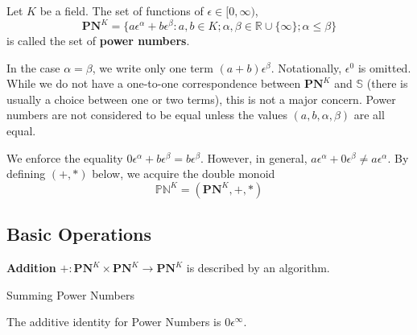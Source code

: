 \documentclass[acmsmall]{acmart}
\begin{document}
\begin{definition}
Let $K$ be a field. The set of functions of $\epsilon \in [0,\infty)$,
$$\mathbf{PN}^K = \{a\epsilon^\alpha + b\epsilon^\beta : a,b \in K;\alpha,\beta\in\mathbb{R}\cup\{\infty\}; \alpha\leq\beta\}$$ 
is called the set of \textbf{power numbers}. 
\end{definition}

In the case $\alpha=\beta$, we write only one term $(a+b)\epsilon^\beta$. Notationally, $\epsilon^0$ is omitted. While we do not have a one-to-one correspondence between $\mathbf{PN}^K$ and $\mathbb{S}$ (there is usually a choice between one or two terms), this is not a major concern. Power numbers are not considered to be equal unless the values $(a,b,\alpha,\beta)$ are all equal.

We enforce the equality $0\epsilon^\alpha + b\epsilon^\beta = b\epsilon^\beta$. However, in general, $a\epsilon^\alpha + 0\epsilon^\beta \neq a\epsilon^\alpha$.
By defining $(+,*)$ below, we acquire the double monoid $$\mathbb{PN}^K = (\mathbf{PN}^K,+,*)$$

\subsection{Basic Operations}
\begin{definition}
\textbf{Addition} $+:\mathbf{PN}^K \times \mathbf{PN}^K \rightarrow \mathbf{PN}^K$ is described by an algorithm.

\begin{algorithm}[H]
	\SetAlgoLined
	
	\caption{Summing Power Numbers}	
\end{algorithm}

The additive identity for Power Numbers is $0\epsilon^\infty$.
\end{definition}
\end{document}
